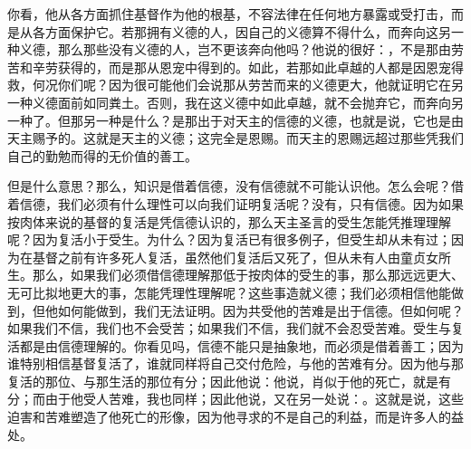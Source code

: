 你看，他从各方面抓住基督作为他的根基，不容法律在任何地方暴露或受打击，而是从各方面保护它。若那拥有义德的人，因自己的义德算不得什么，而奔向这另一种义德，那么那些没有义德的人，岂不更该奔向他吗？他说的很好：，不是那由劳苦和辛劳获得的，而是那从恩宠中得到的。如此，若那如此卓越的人都是因恩宠得救，何况你们呢？因为很可能他们会说那从劳苦而来的义德更大，他就证明它在另一种义德面前如同粪土。否则，我在这义德中如此卓越，就不会抛弃它，而奔向另一种了。但那另一种是什么？是那出于对天主的信德的义德，也就是说，它也是由天主赐予的。这就是天主的义德；这完全是恩赐。而天主的恩赐远超过那些凭我们自己的勤勉而得的无价值的善工。\par

但是什么意思？那么，知识是借着信德，没有信德就不可能认识他。怎么会呢？借着信德，我们必须有什么理性可以向我们证明复活呢？没有，只有信德。因为如果按肉体来说的基督的复活是凭信德认识的，那么天主圣言的受生怎能凭推理理解呢？因为复活小于受生。为什么？因为复活已有很多例子，但受生却从未有过；因为在基督之前有许多死人复活，虽然他们复活后又死了，但从未有人由童贞女所生。那么，如果我们必须借信德理解那低于按肉体的受生的事，那么那远远更大、无可比拟地更大的事，怎能凭理性理解呢？这些事造就义德；我们必须相信他能做到，但他如何能做到，我们无法证明。因为共受他的苦难是出于信德。但如何呢？如果我们不信，我们也不会受苦；如果我们不信，我们就不会忍受苦难。受生与复活都是由信德理解的。你看见吗，信德不能只是抽象地，而必须是借着善工；因为谁特别相信基督复活了，谁就同样将自己交付危险，与他的苦难有分。因为他与那复活的那位、与那生活的那位有分；因此他说：他说，肖似于他的死亡，就是有分；而由于他受人苦难，我也同样；因此他说，又在另一处说：。这就是说，这些迫害和苦难塑造了他死亡的形像，因为他寻求的不是自己的利益，而是许多人的益处。\par


